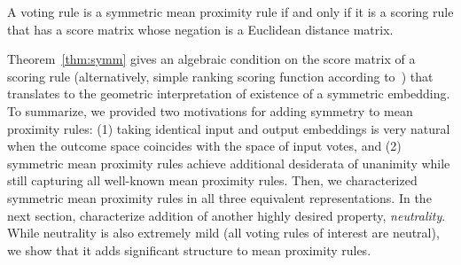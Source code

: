\documentclass[prodmode,acmec]{ec-acmsmall}
\newcommand{\calL}{{\mathcal{L}}}
\newcommand{\rank}{{\calL(A)}}
\DeclareMathOperator*{\argmax}{arg\,max}
\DeclareMathOperator*{\argmin}{arg\,min}
\begin{document}
\begin{theorem}
A voting rule is a symmetric mean proximity rule if and only if it is a scoring rule that has a score matrix whose negation is a Euclidean distance matrix. 
\label{thm:symm}
\end{theorem}

Theorem~\ref{thm:symm} gives an algebraic condition on the score matrix of a scoring rule (alternatively, simple ranking scoring function according to~\cite{CRX09}) that translates to the geometric interpretation of existence of a symmetric embedding. To summarize, we provided two motivations for adding symmetry to mean proximity rules: (1) taking identical input and output embeddings is very natural when the outcome space coincides with the space of input votes, and (2) symmetric mean proximity rules achieve additional desiderata of unanimity while still capturing all well-known mean proximity rules. Then, we characterized symmetric mean proximity rules in all three equivalent representations. In the next section, characterize addition of another highly desired property, \emph{neutrality}. While neutrality is also extremely mild (all voting rules of interest are neutral), we show that it adds significant structure to mean proximity rules. 
\end{document}
